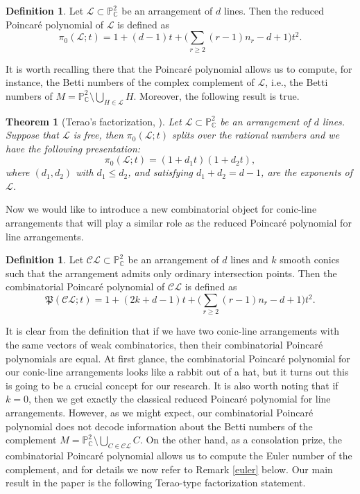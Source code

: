 \documentclass[12pt]{article}
\theoremstyle{plain}
\newtheorem{theorem}[thm]{Theorem}
\theoremstyle{definition}
\newtheorem{definition}[thm]{Definition}
\begin{document}
\begin{definition}
Let $\mathcal{L}\subset \mathbb{P}^{2}_{\mathbb{C}}$ be an arrangement of $d$ lines. Then the reduced Poincar\'e polynomial of $\mathcal{L}$ is defined as
$$\pi_{0}(\mathcal{L};t) = 1 + (d-1)t + \bigg(\sum_{r\geq 2}(r-1)n_{r}-d+1\bigg)t^{2}.$$
\end{definition}
 It is worth recalling there that the Poincar\'e polynomial allows us to compute, for instance, the Betti numbers of the complex complement of $\mathcal{L}$, i.e., the Betti numbers of $M=\mathbb{P}^{2}_{\mathbb{C}} \setminus \bigcup_{H \in \mathcal{L}}H$. Moreover, the following result is true.
\begin{theorem}[{Terao's factorization, \cite{terao}}]
Let $\mathcal{L} \subset \mathbb{P}^{2}_{\mathbb{C}}$ be an arrangement of $d$ lines. Suppose that $\mathcal{L}$ is free, then $\pi_{0}(\mathcal{L};t)$ splits over the rational numbers and we have the following presentation:
$$\pi_{0}(\mathcal{L};t) = (1+d_{1}t)(1+d_{2}t),$$
where $(d_{1}, d_{2})$ with $d_{1} \leq d_{2}$, and satisfying $d_{1} + d_{2} = d-1$, are the exponents of $\mathcal{L}$.
\end{theorem}
Now we would like to introduce a new combinatorial object for conic-line arrangements that will play a similar role as the reduced Poincar\'e polynomial for line arrangements.
\begin{definition}
Let $\mathcal{CL} \subset \mathbb{P}^{2}_{\mathbb{C}}$ be an arrangement of $d$ lines and $k$ smooth conics such that the arrangement admits only ordinary intersection points. Then the combinatorial Poincar\'e polynomial of $\mathcal{CL}$ is defined as
\begin{equation}
\mathfrak{P}(\mathcal{CL};t) = 1 + (2k+d-1)t + \bigg( \sum_{r\geq 2}(r-1)n_{r} -d+1 \bigg)t^{2}.
\end{equation}
\end{definition}
It is clear from the definition that if we have two conic-line arrangements with the same vectors of weak combinatorics, then their combinatorial Poincar\'e polynomials are equal. At first glance, the combinatorial Poincar\'e polynomial for our conic-line arrangements looks like a rabbit out of a hat, but it turns out this is going to be a crucial concept for our research. It is also worth noting that if $k=0$, then we get exactly the classical reduced Poincar\'e polynomial for line arrangements. However, as we might expect, our combinatorial Poincar\'e polynomial does not decode information about the Betti numbers of the complement $M=\mathbb{P}^{2}_{\mathbb{C}} \setminus \bigcup_{C \in \mathcal{CL}}C$. On the other hand, as a consolation prize, the combinatorial Poincar\'e polynomial allows us to compute the Euler number of the complement, and for details we now refer to Remark \ref{euler} below.
\newpage 
Our main result in the paper is the following Terao-type factorization statement.
\end{document}
